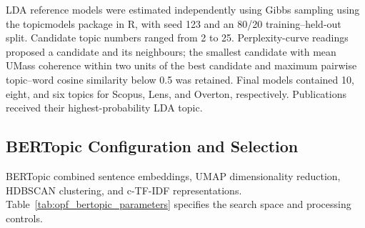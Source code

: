 \documentclass[a4paper,fleqn]{cas-sc}
\begin{document}
    LDA reference models were estimated independently using Gibbs sampling using the topicmodels package in R, with seed 123 and an 80/20 training--held-out split. Candidate topic numbers ranged from 2 to 25. Perplexity-curve readings proposed a candidate and its neighbours; the smallest candidate with mean UMass coherence within two units of the best candidate and maximum pairwise topic--word cosine similarity below 0.5 was retained. Final models contained 10, eight, and six topics for Scopus, Lens, and Overton, respectively. Publications received their highest-probability LDA topic.
    
    
    \subsection{BERTopic Configuration and Selection}\label{sec:bertopic_modelling}
    
    BERTopic combined sentence embeddings, UMAP dimensionality reduction, HDBSCAN clustering, and c-TF-IDF representations. Table~\ref{tab:opf_bertopic_parameters} specifies the search space and processing controls.
    
\end{document}
